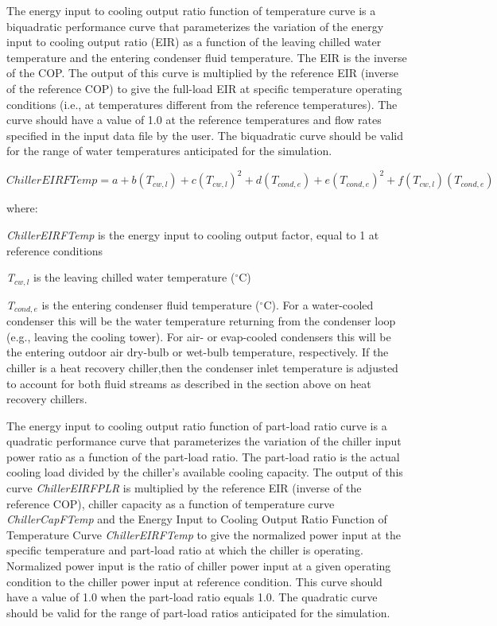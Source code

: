 \bigskip

The energy input to cooling output ratio function of temperature curve is a biquadratic performance curve that parameterizes the variation of the energy input to cooling output ratio (EIR) as a function of the leaving chilled water temperature and the entering condenser fluid temperature. The EIR is the inverse of the COP. The output of this curve is multiplied by the reference EIR (inverse of the reference COP) to give the full-load EIR at specific temperature operating conditions (i.e., at temperatures different from the reference temperatures). The curve should have a value of 1.0 at the reference temperatures and flow rates specified in the input data file by the user. The biquadratic curve should be valid for the range of water temperatures anticipated for the simulation.

\begin{equation}
ChillerEIRFTemp = a + b\left( {{T_{cw,l}}} \right) + c{\left( {{T_{cw,l}}} \right)^2} + d\left( {{T_{cond,e}}} \right) + e{\left( {{T_{cond,e}}} \right)^2} + f\left( {{T_{cw,l}}} \right)\left( {{T_{cond,e}}} \right)
\end{equation}

where:

\emph{ChillerEIRFTemp} is the energy input to cooling output factor, equal to 1 at reference conditions

\emph{T\(_{cw,l}\)} is the leaving chilled water temperature (\(^{\circ}\)C)

\emph{T\(_{cond,e}\)} is the entering condenser fluid temperature (\(^{\circ}\)C). For a water-cooled condenser this will be the water temperature returning from the condenser loop (e.g., leaving the cooling tower). For air- or evap-cooled condensers this will be the entering outdoor air dry-bulb or wet-bulb temperature, respectively. If the chiller is a heat recovery chiller,then the condenser inlet temperature is adjusted to account for both fluid streams as described in the section above on heat recovery chillers.

\bigskip

The energy input to cooling output ratio function of part-load ratio curve is a quadratic performance curve that parameterizes the variation of the chiller input power ratio as a function of the part-load ratio. The part-load ratio is the actual cooling load divided by the chiller's available cooling capacity. The output of this curve \textit{ChillerEIRFPLR} is multiplied by the reference EIR (inverse of the reference COP), chiller capacity as a function of temperature curve \textit{ChillerCapFTemp} and the Energy Input to Cooling Output Ratio Function of Temperature Curve \textit{ChillerEIRFTemp} to give the normalized power input at the specific temperature and part-load ratio at which the chiller is operating. Normalized power input is the ratio of chiller power input at a given operating condition to the chiller power input at reference condition. This curve should have a value of 1.0 when the part-load ratio equals 1.0. The quadratic curve should be valid for the range of part-load ratios anticipated for the simulation.

